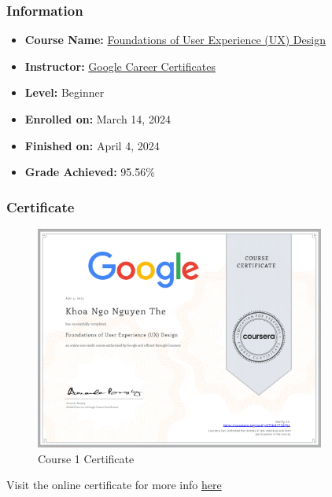 \subsubsection{Information}
\begin{itemize}
	\item \textbf{Course Name:} \href{https://www.coursera.org/learn/foundations-user-experience-design}{Foundations of User Experience (UX) Design}
	\item \textbf{Instructor:} \href{https://www.coursera.org/instructor/google-career-certificates}{Google Career Certificates}
	\item \textbf{Level:} Beginner
	\item \textbf{Enrolled on:} March 14, 2024
	\item \textbf{Finished on:} April 4, 2024
	\item \textbf{Grade Achieved:} 95.56\%
\end{itemize}

\subsubsection{Certificate}
\begin{flushleft}
	\begin{figure}[!ht]
		\centering
		\includegraphics[width=0.85\textwidth]{imgs/Course1.png}
		\caption{Course 1 Certificate}
	\end{figure}

	Visit the online certificate for more info \href{https://www.coursera.org/account/accomplishments/verify/9T5HB7728QSL}{here}
\end{flushleft}

